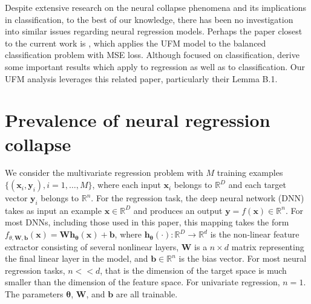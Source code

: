 \documentclass{article}
\theoremstyle{plain}
\theoremstyle{definition}
\theoremstyle{remark}
\newcommand{\bW}{{\mathbf W}}
\newcommand{\bh}{{\mathbf h}}
\newcommand{\by}{{\mathbf y}}
\newcommand{\bx}{{\mathbf x}}
\newcommand{\bb}{{\mathbf b}}
\newcommand{\byi}{{\mathbf y}_i}
\newcommand{\bxi}{{\mathbf x}_i}
\newcommand{\Rd}{\mathbb{R}^d}
\begin{document}
Despite extensive research on the neural collapse phenomena and its implications in classification, to the best of our knowledge,  there has been no investigation into similar issues regarding neural regression models.  Perhaps the paper closest to the current work is \citep{zhou2022optimization}, which applies the UFM model to the balanced classification problem with MSE loss. 
Although focused on classification, \citep{zhou2022optimization} 
derive some important results which apply to regression as well as to classification. 
Our UFM analysis leverages this related paper, particularly their Lemma B.1.  




\section{Prevalence of neural regression collapse}

We consider the multivariate regression problem with $M$ training examples $\{(\bxi,\byi), i=1,\ldots,M \}$, where each input $\bxi$ belongs to $\mathbb{R}^D$ and each 
target vector $\byi$ belongs to $\mathbb{R}^n$. 
For the regression task, the deep neural network (DNN) takes as input an example $\bx \in \mathbb{R}^D$ and produces an output $\by = f(\bx) \in \mathbb{R}^n$. For most DNNs, including those used in this paper, this mapping takes the form
$f_{\theta,\bW,\bb}(\bx)=\bW \bh_{\mathbf{\theta}}(\bx) + \bb$,
where $\bh_{\mathbf{\theta}}(\cdot): \mathbb{R}^D\to \Rd$ is the non-linear feature extractor consisting of several nonlinear layers, $\bW$ is a $n \times d$ matrix representing the final linear layer in the model, and $\bb \in \mathbb{R}^n$ is the bias vector. 
For most neural regression tasks, $n << d$, that is the dimension of the target space is much smaller than the dimension of the feature space. For univariate regression, $n=1$. 
The parameters ${\mathbf{\theta}}$, $\bW$, and $\bb$ are all trainable.
\end{document}
